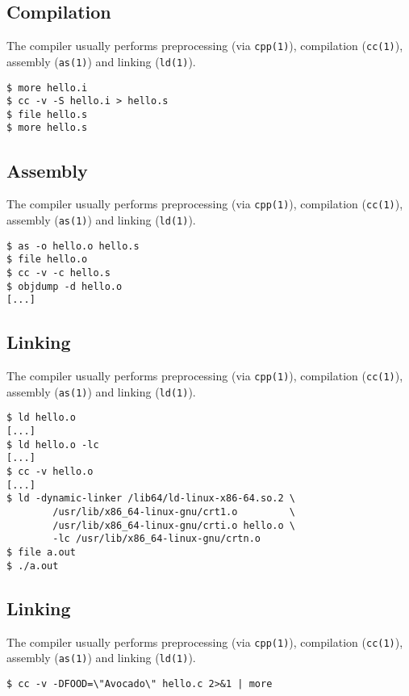 \documentclass[xga]{xdvislides}
\begin{document}
\subsection{Compilation}

The compiler usually performs preprocessing (via {\tt cpp(1)}), compilation
({\tt cc(1)}), assembly ({\tt as(1)}) and linking ({\tt ld(1)}).

\begin{verbatim}
$ more hello.i
$ cc -v -S hello.i > hello.s
$ file hello.s
$ more hello.s
\end{verbatim}

\subsection{Assembly}

The compiler usually performs preprocessing (via {\tt cpp(1)}), compilation
({\tt cc(1)}), assembly ({\tt as(1)}) and linking ({\tt ld(1)}).

\begin{verbatim}
$ as -o hello.o hello.s
$ file hello.o
$ cc -v -c hello.s
$ objdump -d hello.o
[...]
\end{verbatim}

\subsection{Linking}

The compiler usually performs preprocessing (via {\tt cpp(1)}), compilation
({\tt cc(1)}), assembly ({\tt as(1)}) and linking ({\tt ld(1)}).

\begin{verbatim}
$ ld hello.o
[...]
$ ld hello.o -lc
[...]
$ cc -v hello.o
[...]
$ ld -dynamic-linker /lib64/ld-linux-x86-64.so.2 \
        /usr/lib/x86_64-linux-gnu/crt1.o         \
        /usr/lib/x86_64-linux-gnu/crti.o hello.o \
        -lc /usr/lib/x86_64-linux-gnu/crtn.o
$ file a.out
$ ./a.out
\end{verbatim}

\subsection{Linking}

The compiler usually performs preprocessing (via {\tt cpp(1)}), compilation
({\tt cc(1)}), assembly ({\tt as(1)}) and linking ({\tt ld(1)}).

\begin{verbatim}
$ cc -v -DFOOD=\"Avocado\" hello.c 2>&1 | more
\end{verbatim}
\end{document}
